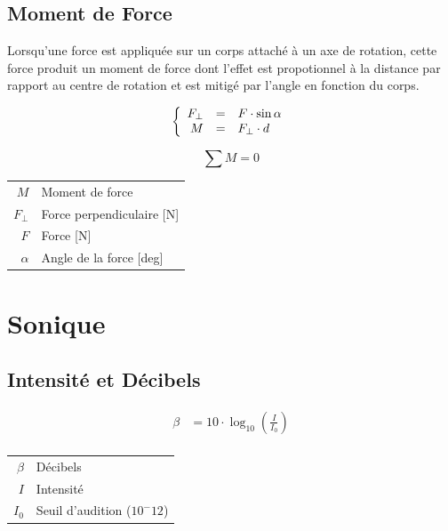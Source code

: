 \documentclass[12pt,a4paper]{article} %
\begin{document}
\subsection{Moment de Force}
Lorsqu'une force est appliquée sur un corps attaché à un axe de rotation, cette force produit un moment de force dont l'effet est propotionnel à la distance par rapport au centre de rotation et est mitigé par l'angle en fonction du corps.
\par\hspace{1em}
\begin{mdframed}[leftmargin=2em, rightmargin=2em]
	\begin{twocols}[0.5][0.5]
	$$
		\left\{
			\begin{array}{rcl}
			F_\perp & = & F \cdot \sin \alpha \\
			M & = & F_\perp \cdot d \\
			\end{array}
		\right.
	$$

	$$
		\sum M = 0
	$$
	\nextcol
	\begin{tabular}{rl}
		$M$ & Moment de force \\
		$F_\perp$ & Force perpendiculaire [N] \\
		$F$ & Force [N] \\
		$\alpha$ & Angle de la force [deg] \\
	\end{tabular}
	\end{twocols}
\end{mdframed}

\newpage

\section{Sonique}

\subsection{Intensité et Décibels}
\begin{twocols}
	\begin{align*}
		\beta &= 10 \cdot \log_{10}\left(\frac{I}{I_0}\right) \\
	\end{align*}
\nextcol
	\begin{tabular}{rl}
		$\beta$ & Décibels \\
		$I$ & Intensité \\
		$I_0$ & Seuil d'audition ($10^-12$) \\
	\end{tabular}
\end{twocols}
\end{document}
